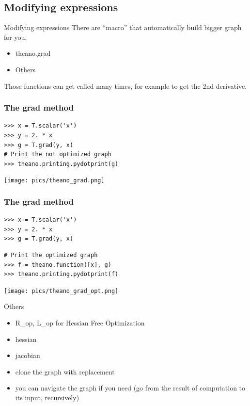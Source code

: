 \documentclass[utf8x,xcolor=pdftex,dvipsnames,table]{beamer}
\begin{document}
\subsection{Modifying expressions}
\begin{frame}{Modifying expressions}
  There are ``macro'' that automatically build bigger graph for you.
  \begin{itemize}
  \item theano.grad
  \item Others
  \end{itemize}
  Those functions can get called many times, for example to get the 2nd
  derivative.
\end{frame}

\begin{frame}[fragile]
  \frametitle{The grad method}

\begin{lstlisting}
>>> x = T.scalar('x')
>>> y = 2. * x
>>> g = T.grad(y, x)
# Print the not optimized graph
>>> theano.printing.pydotprint(g)
\end{lstlisting}
\texttt{[image: pics/theano\_grad.png]}
\end{frame}

\begin{frame}[fragile]
  \frametitle{The grad method}
\begin{lstlisting}
>>> x = T.scalar('x')
>>> y = 2. * x
>>> g = T.grad(y, x)
\end{lstlisting}
\begin{lstlisting}
# Print the optimized graph
>>> f = theano.function([x], g)
>>> theano.printing.pydotprint(f)
\end{lstlisting}
\texttt{[image: pics/theano\_grad\_opt.png]}
\end{frame}

\begin{frame}{Others}
  \begin{itemize}
  \item R\_op, L\_op for Hessian Free Optimization
  \item hessian
  \item jacobian
  \item clone the graph with replacement
  \item you can navigate the graph if you need
      (go from the result of computation to its input, recursively)
  \end{itemize}
\end{frame}
\end{document}
